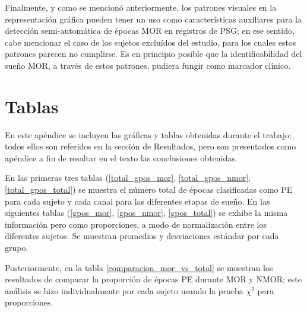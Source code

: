 \documentclass[12pt,a4paper]{mitthesis}
\begin{document}
Finalmente, y como se mencion\'o anteriormente, los patrones visuales en la representaci\'on 
gr\'afica pueden tener un uso como caracter\'isticas auxiliares para la detecci\'on 
semi-autom\'atica de \'epocas MOR en registros de PSG; en ese sentido, cabe mencionar el caso de 
los sujetos exclu\'idos del estudio, para los cuales estos patrones parecen no cumplirse. 
Es en principio posible que la identificabilidad del sue\~no MOR, a trav\'es de estos patrones, 
pudiera fungir como marcador cl\'inico. %


\appendix

\chapter{Tablas}

En este ap\'endice se incluyen las gr\'aficas y tablas obtenidas durante el trabajo; todos ellos 
son referidos en la secci\'on de Resultados, pero son presentados como ap\'endice a fin de resaltar 
en el texto las conclusiones obtenidas.

En las primeras tres tablas (\ref{total_gpos_mor}, \ref{total_gpos_nmor}, \ref{total_gpos_total}) 
se muestra el n\'umero total de \'epocas clasificadas como PE para cada sujeto y cada canal para 
las diferentes etapas de sue\~no. En las siguientes tablas (\ref{gpos_mor}, \ref{gpos_nmor}, 
\ref{gpos_total}) se exhibe la misma informaci\'on pero como proporciones, a modo de 
normalizaci\'on entre los diferentes sujetos. Se muestran promedios y desviaciones est\'andar por 
cada grupo.

Posteriormente, en la tabla \ref{comparacion_mor_vs_total} se muestran los resultados de comparar 
la proporci\'on de \'epocas PE durante MOR y NMOR; este an\'alisis se hizo individualmente por cada
sujeto usando la prueba $\chi^{2}$ para proporciones.

\end{document}
